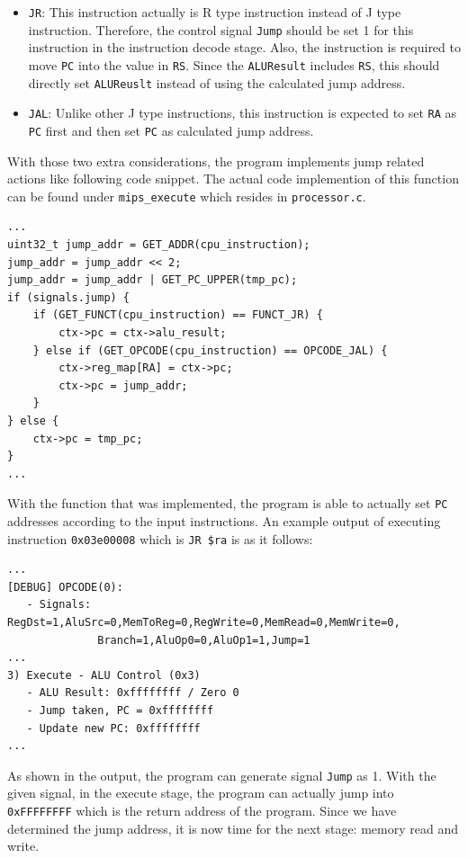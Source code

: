 \documentclass{homework}
\begin{document}
\begin{itemize}
    \item \texttt{JR}: This instruction actually is R type instruction instead of J type instruction. Therefore, the control signal \texttt{Jump} should be set 1 for this instruction in the instruction decode stage. Also, the instruction is required to move \texttt{PC} into the value in \texttt{RS}. Since the \texttt{ALUResult} includes \texttt{RS}, this should directly set \texttt{ALUReuslt} instead of using the calculated jump address.
    \item \texttt{JAL}: Unlike other J type instructions, this instruction is expected to set \texttt{RA} as \texttt{PC} first and then set \texttt{PC} as calculated jump address.
\end{itemize} 
With those two extra considerations, the program implements jump related actions like following code snippet. The actual code implemention of this function can be found under \texttt{mips_execute} which resides in \texttt{processor.c}.
\\
\begin{center}
\begin{code}
\begin{verbatim}
...
uint32_t jump_addr = GET_ADDR(cpu_instruction);
jump_addr = jump_addr << 2; 
jump_addr = jump_addr | GET_PC_UPPER(tmp_pc); 
if (signals.jump) {
    if (GET_FUNCT(cpu_instruction) == FUNCT_JR) {
        ctx->pc = ctx->alu_result;
    } else if (GET_OPCODE(cpu_instruction) == OPCODE_JAL) { 
        ctx->reg_map[RA] = ctx->pc;
        ctx->pc = jump_addr;
    }
} else {
    ctx->pc = tmp_pc;
}
...
\end{verbatim}
\end{code}
\end{center}
With the function that was implemented, the program is able to actually set \texttt{PC} addresses according to the input instructions. An example output of executing instruction \texttt{0x03e00008} which is \texttt{JR \$ra} is as it follows:
\\
\begin{center}
\begin{code}
\begin{verbatim}
...
[DEBUG] OPCODE(0):
   - Signals: RegDst=1,AluSrc=0,MemToReg=0,RegWrite=0,MemRead=0,MemWrite=0,
              Branch=1,AluOp0=0,AluOp1=1,Jump=1
...
3) Execute - ALU Control (0x3)
   - ALU Result: 0xffffffff / Zero 0
   - Jump taken, PC = 0xffffffff
   - Update new PC: 0xffffffff
...
\end{verbatim}
\end{code}
\end{center}
As shown in the output, the program can generate signal \texttt{Jump} as 1. With the given signal, in the execute stage, the program can actually jump into \texttt{0xFFFFFFFF} which is the return address of the program. Since we have determined the jump address, it is now time for the next stage: memory read and write.
\pagebreak
\end{document}
